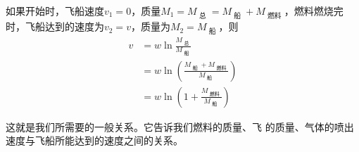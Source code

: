 如果开始时，飞船速度$ v _ { 1 } = 0 $，质量$ M _ { 1 } = M _ { \text { 总 } } = M _ { \text { 船 } } + M _ { \text { 燃料 } } $，燃料燃烧完时，飞船达到的速度为$ v _ { 2 } = v $，质量为$ M _ { 2 } = M _ { \text { 船 } } $，则
\begin{equation}\label{key}
  \begin{split}
    v & = w \ln \frac { M _ { \text { 总 } } } { M _ { \text { 船 } } }  \\
    & = w \ln \left( \frac { M _ { \text { 船 } } + M _ { \text { 燃料 } } } { M _ { \text { 船 } } } \right) \\
    & = w \ln \left( 1 + \frac { M _ { \text { 燃料 } } } { M _ { \text { 船 } } } \right)
  \end{split}
\end{equation}

这就是我们所需要的一般关系。它告诉我们燃料的质量、飞
的质量、气体的喷出速度与飞船所能达到的速度之间的关系。